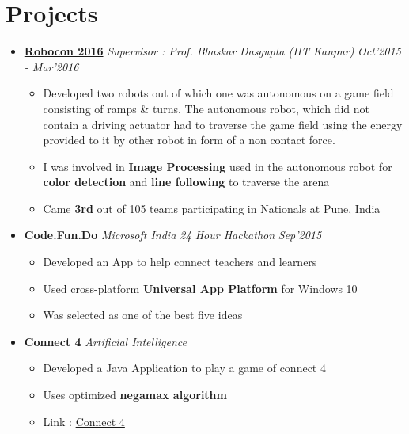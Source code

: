 \documentclass[11pt,a4paper]{moderncv}
\newcommand{\experience}[3]{
  \item \textbf{\large{#1}} \hfill \emph{#3} \hfill \textit{#2}
}
\begin{document}
  \section{Projects}
    \begin{itemize}
        \experience{\href{http://students.iitk.ac.in/robocon/}{Robocon 2016}}{Oct'2015 - Mar'2016}{Supervisor : Prof. Bhaskar Dasgupta (IIT Kanpur)}
      \begin{itemize}
        \item Developed two robots out of which one was autonomous on a game field consisting of ramps \& turns. The autonomous robot, which did not contain a driving actuator had to traverse the game field using the energy provided to it by other robot in form of a non contact force.
        \item I was involved in \textbf{Image Processing} used in the autonomous robot for \textbf{color detection} and \textbf{line following} to traverse the arena
        \item Came \textbf{3rd} out of 105 teams participating in Nationals at Pune, India
      \end{itemize}
      \experience{Code.Fun.Do}{Sep'2015}{Microsoft India 24 Hour Hackathon}
      \begin{itemize}
        \item Developed an App to help connect teachers and learners
        \item Used cross-platform \textbf{Universal App Platform} for Windows 10
        \item Was selected as one of the best five ideas
      \end{itemize}
      \experience{Connect 4}{}{Artificial Intelligence}
      \begin{itemize}
        \item Developed a Java Application to play a game of connect 4
        \item Uses optimized \textbf{negamax algorithm}
        \item Link : \href{http://github.com/yashsriv/Connect-4}{Connect 4}
      \end{itemize}
    \end{itemize}
\end{document}
